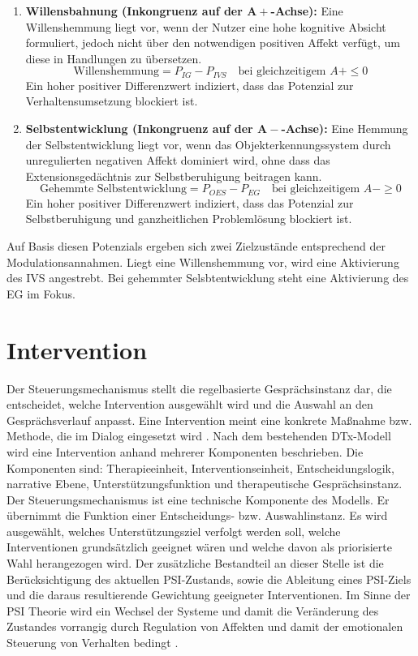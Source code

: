 \begin{enumerate}
    \item \textbf{Willensbahnung (Inkongruenz auf der $\boldsymbol{A+}$-Achse):} 
    Eine Willenshemmung liegt vor, wenn der Nutzer eine hohe kognitive Absicht formuliert, jedoch nicht über den notwendigen positiven Affekt verfügt, um diese in Handlungen zu übersetzen.
    \begin{equation}
        \text{Willenshemmung} = P_{IG} - P_{IVS} \quad \text{bei gleichzeitigem } A+ \le 0
    \end{equation}
    Ein hoher positiver Differenzwert indiziert, dass das Potenzial zur Verhaltensumsetzung blockiert ist.
    
    \item \textbf{Selbstentwicklung (Inkongruenz auf der $\boldsymbol{A-}$-Achse):}
    Eine Hemmung der Selbstentwicklung liegt vor, wenn das Objekterkennungssystem durch unregulierten negativen Affekt dominiert wird, ohne dass das Extensionsgedächtnis zur Selbstberuhigung beitragen kann.
    \begin{equation}
        \text{Gehemmte Selbstentwicklung} = P_{OES} - P_{EG} \quad \text{bei gleichzeitigem } A- \ge 0
    \end{equation}
    Ein hoher positiver Differenzwert indiziert, dass das Potenzial zur Selbstberuhigung und ganzheitlichen Problemlösung blockiert ist.
\end{enumerate}

Auf Basis diesen Potenzials ergeben sich zwei Zielzustände entsprechend der Modulationsannahmen. Liegt eine Willenshemmung vor, wird eine Aktivierung des IVS angestrebt. Bei gehemmter Selsbtentwicklung steht eine Aktivierung des EG im Fokus.

\section{Intervention}
Der Steuerungsmechanismus stellt die regelbasierte Gesprächsinstanz dar, die entscheidet, welche Intervention ausgewählt wird und die Auswahl an den Gesprächsverlauf anpasst. Eine Intervention meint eine konkrete Maßnahme bzw. Methode, die im Dialog eingesetzt wird \citep{baumel2025more}. Nach dem bestehenden DTx-Modell wird eine Intervention anhand mehrerer Komponenten beschrieben. Die Komponenten sind: Therapieeinheit, Interventionseinheit, Entscheidungslogik, narrative Ebene, Unterstützungsfunktion und therapeutische Gesprächsinstanz. Der Steuerungsmechanismus ist eine technische Komponente des Modells. Er übernimmt die Funktion einer Entscheidungs- bzw. Auswahlinstanz. Es wird ausgewählt, welches Unterstützungsziel verfolgt werden soll, welche Interventionen grundsätzlich geeignet wären und welche davon als priorisierte Wahl herangezogen wird. Der zusätzliche Bestandteil an dieser Stelle ist die Berücksichtigung des aktuellen PSI-Zustands, sowie die Ableitung eines PSI-Ziels und die daraus resultierende Gewichtung geeigneter Interventionen. Im Sinne der PSI Theorie wird ein Wechsel der Systeme und damit die Veränderung des Zustandes vorrangig durch Regulation von Affekten und damit der emotionalen Steuerung von Verhalten bedingt \citep{Kuhl2000The}.

